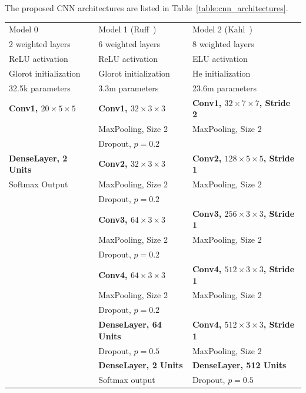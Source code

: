 The proposed CNN architectures are listed in Table~\ref{table:cnn_architectures}.

\begin{table}[hp]
\begin{center}
\begin{tabular}{l l l}
\toprule
Model 0 & Model 1 (Ruff~\cite{ruff2020automated}) & Model 2 (Kahl~\cite{kahl2017large}) \\[0.5ex]
2 weighted layers & 6 weighted layers & 8 weighted layers \\[0.5ex]
ReLU activation & ReLU activation & ELU activation \\[0.5ex]
Glorot initialization & Glorot initialization & He initialization \\[0.5ex]
32.5k parameters & 3.3m parameters & 23.6m parameters \\[0.5ex]
\midrule
\textbf{Conv1, $20 \times 5 \times 5$} &
\textbf{Conv1, $32 \times 3 \times 3$} &
\textbf{Conv1, $32 \times 7 \times 7$, Stride 2} \\
& MaxPooling, Size 2 & MaxPooling, Size 2 \\
& Dropout, $p=0.2$ & \\[1ex]
\textbf{DenseLayer, 2 Units} &
\textbf{Conv2, $32 \times 3 \times 3$} &
\textbf{Conv2, $128 \times 5 \times 5$, Stride 1} \\
Softmax Output & MaxPooling, Size 2 & MaxPooling, Size 2 \\
& Dropout, $p=0.2$ & \\[1ex]
& \textbf{Conv3, $64 \times 3 \times 3$} &
\textbf{Conv3, $256 \times 3 \times 3$, Stride 1} \\
& MaxPooling, Size 2 & MaxPooling, Size 2 \\
& Dropout, $p=0.2$ & \\[1ex]
& \textbf{Conv4, $64 \times 3 \times 3$} &
\textbf{Conv4, $512 \times 3 \times 3$, Stride 1} \\
& MaxPooling, Size 2 & MaxPooling, Size 2 \\
& Dropout, $p=0.2$ & \\[1ex]
& \textbf{DenseLayer, 64 Units} &
\textbf{Conv4, $512 \times 3 \times 3$, Stride 1} \\
& Dropout, $p=0.5$ & MaxPooling, Size 2 \\[1ex]
& \textbf{DenseLayer, 2 Units} &
\textbf{DenseLayer, 512 Units} \\
& Softmax output & Dropout, $p=0.5$ \\[1ex]

\end{tabular}
\end{center}
\end{table}
